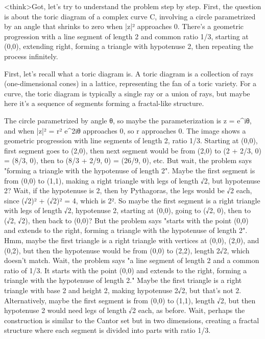<think>Got, let's try to understand the problem step by step. First, the question is about the toric diagram of a complex curve C, involving a circle parametrized by an angle that shrinks to zero when |z|² approaches 0. There's a geometric progression with a line segment of length 2 and common ratio 1/3, starting at (0,0), extending right, forming a triangle with hypotenuse 2, then repeating the process infinitely.

First, let's recall what a toric diagram is. A toric diagram is a collection of rays (one-dimensional cones) in a lattice, representing the fan of a toric variety. For a curve, the toric diagram is typically a single ray or a union of rays, but maybe here it's a sequence of segments forming a fractal-like structure.

The circle parametrized by angle θ, so maybe the parameterization is z = e^{iθ}, and when |z|² = r² e^{2iθ} approaches 0, so r approaches 0. The image shows a geometric progression with line segments of length 2, ratio 1/3. Starting at (0,0), first segment goes to (2,0), then next segment would be from (2,0) to (2 + 2/3, 0) = (8/3, 0), then to (8/3 + 2/9, 0) = (26/9, 0), etc. But wait, the problem says "forming a triangle with the hypotenuse of length 2". Maybe the first segment is from (0,0) to (1,1), making a right triangle with legs of length √2, but hypotenuse 2? Wait, if the hypotenuse is 2, then by Pythagoras, the legs would be √2 each, since (√2)² + (√2)² = 4, which is 2². So maybe the first segment is a right triangle with legs of length √2, hypotenuse 2, starting at (0,0), going to (√2, 0), then to (√2, √2), then back to (0,0)? But the problem says "starts with the point (0,0) and extends to the right, forming a triangle with the hypotenuse of length 2". Hmm, maybe the first triangle is a right triangle with vertices at (0,0), (2,0), and (0,2), but then the hypotenuse would be from (0,0) to (2,2), length 2√2, which doesn't match. Wait, the problem says "a line segment of length 2 and a common ratio of 1/3. It starts with the point (0,0) and extends to the right, forming a triangle with the hypotenuse of length 2." Maybe the first triangle is a right triangle with base 2 and height 2, making hypotenuse 2√2, but that's not 2. Alternatively, maybe the first segment is from (0,0) to (1,1), length √2, but then hypotenuse 2 would need legs of length √2 each, as before. Wait, perhaps the construction is similar to the Cantor set but in two dimensions, creating a fractal structure where each segment is divided into parts with ratio 1/3.


